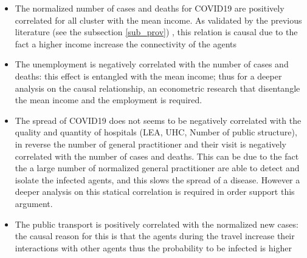 \documentclass[
12pt, %
a4paper, %
oneside, %
headinclude,footinclude, %
BCOR5mm, %
]{scrartcl}
\begin{document}
\begin{itemize}
\item The normalized number of cases and deaths for COVID19 are positively correlated for all cluster with the mean income. As validated by the previous literature (see the subsection \ref{sub_prov}) , this relation is causal due to the fact a higher income increase the connectivity of the agents
\item The unemployment is negatively correlated with the number of cases and deaths: this effect is entangled with the mean income; thus for a deeper analysis on the causal relationship, an econometric research that disentangle the mean income and the employment is required. 
\item The spread of COVID19 does not seems to be negatively correlated with the quality and quantity of hospitals (LEA, UHC, Number of public structure), in reverse the number of general practitioner and their visit is negatively correlated with the number of cases and deaths. This can be due to the fact the a large number of normalized general practitioner are able to detect and isolate the infected agents, and this slows the spread of a disease. However a deeper analysis on this statical correlation is required in order support this argument. 
\item The public transport is positively correlated with the normalized new cases: the causal reason for this is that the agents during the travel increase their interactions with other agents thus the probability to be infected is higher
\end{itemize}
\end{document}
